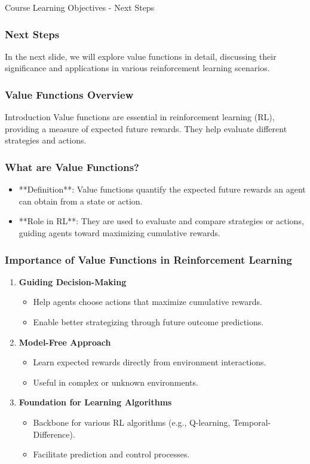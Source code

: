 \documentclass[aspectratio=169]{beamer}
\begin{document}
\begin{frame}[fragile]{Course Learning Objectives - Next Steps}
    \frametitle{Next Steps}

    In the next slide, we will explore value functions in detail, discussing their significance and applications in various reinforcement learning scenarios.

\end{frame}

\begin{frame}[fragile]
    \frametitle{Value Functions Overview}
    \begin{block}{Introduction}
        Value functions are essential in reinforcement learning (RL), providing a measure of expected future rewards. They help evaluate different strategies and actions.
    \end{block}
\end{frame}

\begin{frame}[fragile]
    \frametitle{What are Value Functions?}
    \begin{itemize}
        \item **Definition**: Value functions quantify the expected future rewards an agent can obtain from a state or action.
        \item **Role in RL**: They are used to evaluate and compare strategies or actions, guiding agents toward maximizing cumulative rewards.
    \end{itemize}
\end{frame}

\begin{frame}[fragile]
    \frametitle{Importance of Value Functions in Reinforcement Learning}
    \begin{enumerate}
        \item \textbf{Guiding Decision-Making}
            \begin{itemize}
                \item Help agents choose actions that maximize cumulative rewards.
                \item Enable better strategizing through future outcome predictions.
            \end{itemize}
        \item \textbf{Model-Free Approach}
            \begin{itemize}
                \item Learn expected rewards directly from environment interactions.
                \item Useful in complex or unknown environments.
            \end{itemize}
        \item \textbf{Foundation for Learning Algorithms}
            \begin{itemize}
                \item Backbone for various RL algorithms (e.g., Q-learning, Temporal-Difference).
                \item Facilitate prediction and control processes.
            \end{itemize}
    \end{enumerate}
\end{frame}
\end{document}

